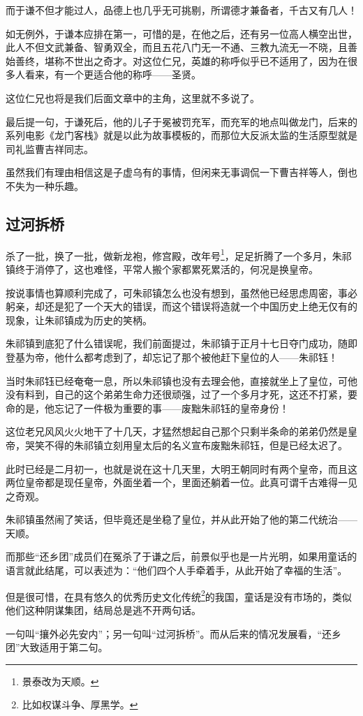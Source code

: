 \begin{multicols}{\theparacolNo}
而于谦不但才能过人，品德上也几乎无可挑剔，所谓德才兼备者，千古又有几人！

如无例外，于谦本应排在第一，可惜的是，在他之后，还有另一位高人横空出世，此人不但文武兼备、智勇双全，而且五花八门无一不通、三教九流无一不晓，且善始善终，堪称不世出之奇才。对这位仁兄，英雄的称呼似乎已不适用了，因为在很多人看来，有一个更适合他的称呼——圣贤。

这位仁兄也将是我们后面文章中的主角，这里就不多说了。

最后提一句，于谦死后，他的儿子于冕被罚充军，而充军的地点叫做龙门，后来的系列电影《龙门客栈》就是以此为故事模板的，而那位大反派太监的生活原型就是司礼监曹吉祥同志。

虽然我们有理由相信这是子虚乌有的事情，但闲来无事调侃一下曹吉祥等人，倒也不失为一种乐趣。

\subsection{过河拆桥}
杀了一批，换了一批，做新龙袍，修宫殿，改年号\footnote{景泰改为天顺。}，足足折腾了一个多月，朱祁镇终于消停了，这也难怪，平常人搬个家都累死累活的，何况是换皇帝。

按说事情也算顺利完成了，可朱祁镇怎么也没有想到，虽然他已经思虑周密，事必躬亲，却还是犯了一个天大的错误，而这个错误将造就一个中国历史上绝无仅有的现象，让朱祁镇成为历史的笑柄。

朱祁镇到底犯了什么错误呢，我们前面提过，朱祁镇于正月十七日夺门成功，随即登基为帝，他什么都考虑到了，却忘记了那个被他赶下皇位的人——朱祁钰！

当时朱祁钰已经奄奄一息，所以朱祁镇也没有去理会他，直接就坐上了皇位，可他没有料到，自己的这个弟弟生命力还很顽强，过了一个多月才死，这还不打紧，要命的是，他忘记了一件极为重要的事——废黜朱祁钰的皇帝身份！

这位老兄风风火火地干了十几天，才猛然想起自己那个只剩半条命的弟弟仍然是皇帝，哭笑不得的朱祁镇立刻用皇太后的名义宣布废黜朱祁钰，但是已经太迟了。

此时已经是二月初一，也就是说在这十几天里，大明王朝同时有两个皇帝，而且这两位皇帝都是现任皇帝，外面坐着一个，里面还躺着一位。此真可谓千古难得一见之奇观。

朱祁镇虽然闹了笑话，但毕竟还是坐稳了皇位，并从此开始了他的第二代统治——天顺。

而那些“还乡团”成员们在冤杀了于谦之后，前景似乎也是一片光明，如果用童话的语言就此结尾，可以表述为：“他们四个人手牵着手，从此开始了幸福的生活”。

但是很可惜，在具有悠久的优秀历史文化传统\footnote{比如权谋斗争、厚黑学。}的我国，童话是没有市场的，类似他们这种阴谋集团，结局总是逃不开两句话。

一句叫“攘外必先安内”；另一句叫“过河拆桥”。而从后来的情况发展看，“还乡团”大致适用于第二句。
\ifnum{}
	\end{multicols}
\fi
\newpage
